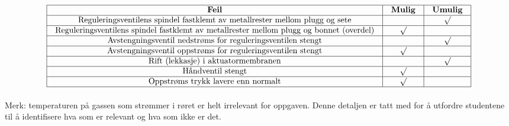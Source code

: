$$\vbox{\offinterlineskip
\halign{\strut
\vrule \quad\hfil # \ \hfil & 
\vrule \quad\hfil # \ \hfil & 
\vrule \quad\hfil # \ \hfil \vrule \cr
\noalign{\hrule}
%
{\bf Feil} & {\bf Mulig} & {\bf Umulig} \cr
%
\noalign{\hrule}
%
Reguleringsventilens spindel fastklemt av metallrester mellom plugg og sete &  & $\surd$ \cr
%
\noalign{\hrule}
%
Reguleringsventilens spindel fastklemt av metallrester mellom plugg og bonnet (overdel) & $\surd$ &  \cr
%
\noalign{\hrule}
%
Avstengningsventil nedstrøms for reguleringsventilen stengt &  & $\surd$ \cr
%
\noalign{\hrule}
%
Avstengningsventil oppstrøms for reguleringsventilen stengt & $\surd$ &  \cr
%
\noalign{\hrule}
%
Rift (lekkasje) i aktuatormembranen &  & $\surd$ \cr
%
\noalign{\hrule}
%
Håndventil stengt & $\surd$ &  \cr
%
\noalign{\hrule}
%
Oppstrøms trykk lavere enn normalt & $\surd$ &  \cr
%
\noalign{\hrule}
} %
}$$ %

Merk: temperaturen på gassen som strømmer i røret er helt irrelevant for oppgaven. Denne detaljen er tatt med for å utfordre studentene til å identifisere hva som er relevant og hva som ikke er det.


